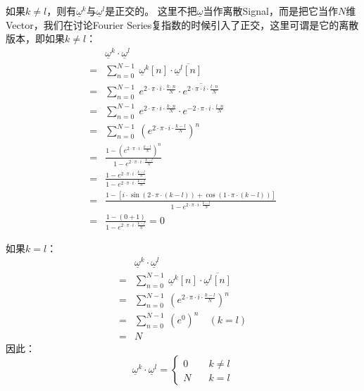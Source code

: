 如果$k\neq l$，则有$\underline{\omega}^k$与$\underline{\omega}^l$是正交的。
这里不把$\underline{\omega}$当作离散Signal，而是把它当作$N$维Vector，我们在讨论Fourier Series复指数的时候引入了正交，这里可谓是它的离散版本，即如果$k\neq l$：
\begin{align*}
	  & \underline{\omega}^k\cdot \underline{\omega}^l                                                                                       \\
	= & \sum\limits_{n=0}^{N-1}\ \underline{\omega}^k[n]\cdot \overline{\underline{\omega}^l[n]}                                             \\
	= & \sum\limits_{n=0}^{N-1}\ e^{2\cdot \pi\cdot i\cdot \frac{k\cdot n}{N}}\cdot \overline{e^{2\cdot \pi\cdot i\cdot \frac{l\cdot n}{N}}} \\
	= & \sum\limits_{n=0}^{N-1}\ e^{2\cdot \pi\cdot i\cdot \frac{k\cdot n}{N}}\cdot e^{-2\cdot \pi\cdot i\cdot \frac{l\cdot n}{N}}           \\
	= & \sum\limits_{n=0}^{N-1}\ (e^{2\cdot \pi\cdot i\cdot \frac{k-l}{N}})^n                                                                \\
	= & \frac{1-(e^{2\cdot \pi\cdot i\cdot \frac{k-l}{N}})^n}{1-e^{2\cdot \pi\cdot i\cdot \frac{k-l}{N}}}                                    \\
	= & \frac{1-e^{2\cdot \pi\cdot i\cdot \frac{k-l}{N}}}{1-e^{2\cdot \pi\cdot i\cdot \frac{k-l}{N}}}                                        \\
	= & \frac{1-[i\cdot\sin(2\cdot\pi\cdot(k-l))+\cos(1\cdot\pi\cdot(k-l))]}{1-e^{2\cdot \pi\cdot i\cdot \frac{k-l}{N}}}                     \\
	= & \frac{1-(0+1)}{1-e^{2\cdot \pi\cdot i\cdot \frac{k-l}{N}}}=0
\end{align*}

如果$k=l$：
\begin{align*}
	  & \underline{\omega}^k\cdot \underline{\omega}^l                                          \\
	= & \sum\limits_{n=0}^{N-1}\ \underline{\omega}^k[n]\cdot\overline{\underline{\omega}^l[n]} \\
	= & \sum\limits_{n=0}^{N-1}\ (e^{2\cdot \pi\cdot i\cdot \frac{k-l}{N}})^n                   \\
	= & \sum\limits_{n=0}^{N-1}\ (e^0)^n\quad (k=l)                                             \\
	= & N
\end{align*}
因此：
\begin{equation}
	\underline{\omega}^k\cdot \underline{\omega}^l=
	\begin{cases}
		0\quad & k\neq l \\
		N\quad & k=l
	\end{cases}
\end{equation}

